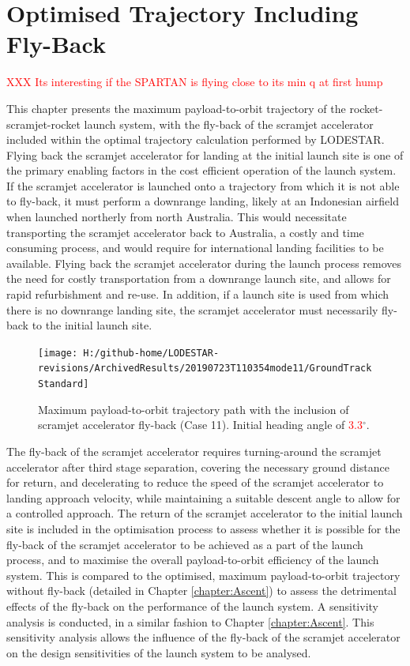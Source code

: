 
\cleardoublepage
\chapter{Optimised Trajectory Including Fly-Back}\label{chapter:Flyback}
\textcolor{red}{ XXX Its interesting if the SPARTAN is flying close to its min q at first hump}
	
This chapter presents the maximum payload-to-orbit trajectory of the rocket-scramjet-rocket launch system, with the fly-back of the scramjet accelerator included within the optimal trajectory calculation performed by LODESTAR. 
Flying back the scramjet accelerator for landing at the initial launch site is one of the primary enabling factors in the cost efficient operation of the launch system. If the scramjet accelerator is launched onto a trajectory from which it is not able to fly-back, it must perform a downrange landing, likely at an Indonesian airfield when launched northerly from north Australia. This would necessitate transporting the scramjet accelerator back to Australia, a costly and time consuming process, and would require for international landing facilities to be available. 
Flying back the scramjet accelerator during the launch process removes the need for costly transportation from a downrange launch site, and allows for rapid refurbishment and re-use.
In addition, if a launch site is used from which there is no downrange landing site, the scramjet accelerator must necessarily fly-back to the initial launch site. 


\begin{figure}[ht]%
	\centering
	\texttt{[image: H:/github-home/LODESTAR-revisions/ArchivedResults/20190723T110354mode11/GroundTrackStandard]}
	\caption{Maximum payload-to-orbit trajectory path with the inclusion of scramjet accelerator fly-back (Case 11). Initial heading angle of \textcolor{red}{3.3}$^\circ$.} %
	\label{fig:GroundTrackStandard}
\end{figure}

The fly-back of the scramjet accelerator requires turning-around the scramjet accelerator after third stage separation, covering the necessary ground distance for return, and decelerating to reduce the speed of the scramjet accelerator to landing approach velocity, while maintaining a suitable descent angle to allow for a controlled approach. 
The return of the scramjet accelerator to the initial launch site is included in the optimisation process to assess whether it is possible for the fly-back of the scramjet accelerator to be achieved as a part of the launch process, and to maximise the overall payload-to-orbit efficiency of the launch system. This is compared to the optimised, maximum payload-to-orbit trajectory without fly-back (detailed in Chapter \ref{chapter:Ascent}) to assess the detrimental effects of the fly-back on the performance of the launch system. 
A sensitivity analysis is conducted, in a similar fashion to Chapter \ref{chapter:Ascent}. 
This sensitivity analysis allows the influence of the fly-back of the scramjet accelerator on the design sensitivities of the launch system to be analysed.



